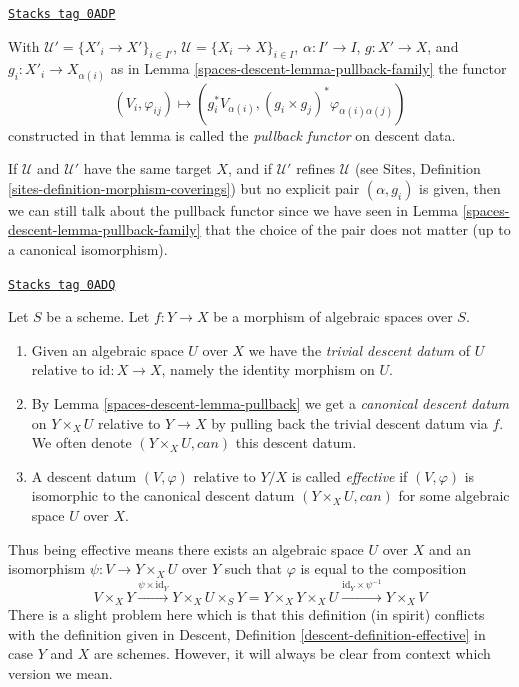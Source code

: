 \begin{definition}
\label{spaces-descent-definition-pullback-functor-family}
\href{https://stacks.math.columbia.edu/tag/0ADP}{\texttt{Stacks tag 0ADP}}

With $\mathcal{U}' = \{X'_i \to X'\}_{i \in I'}$,
$\mathcal{U} = \{X_i \to X\}_{i \in I}$, $\alpha : I' \to I$,
$g : X' \to X$, and $g_i : X'_i \to X_{\alpha(i)}$ as in
Lemma \ref{spaces-descent-lemma-pullback-family} the functor
$$
(V_i, \varphi_{ij}) \longmapsto
(g_i^*V_{\alpha(i)}, (g_i \times g_j)^*\varphi_{\alpha(i) \alpha(j)})
$$
constructed in that lemma
is called the {\it pullback functor} on descent data.
\end{definition}

If $\mathcal{U}$ and $\mathcal{U}'$ have the same target $X$,
and if $\mathcal{U}'$ refines $\mathcal{U}$ (see
Sites, Definition \ref{sites-definition-morphism-coverings})
but no explicit pair $(\alpha, g_i)$ is given, then we can still
talk about the pullback functor since we have seen in
Lemma \ref{spaces-descent-lemma-pullback-family} that the choice of the pair does not matter
(up to a canonical isomorphism).

\begin{definition}[Effective]
\label{spaces-descent-definition-effective}
\href{https://stacks.math.columbia.edu/tag/0ADQ}{\texttt{Stacks tag 0ADQ}}

Let $S$ be a scheme. Let $f : Y \to X$ be a morphism of algebraic spaces over
$S$.
\begin{enumerate}
\item Given an algebraic space $U$ over $X$ we have the
{\it trivial descent datum} of $U$ relative to $\text{id} : X \to X$, namely
the identity morphism on $U$.
\item By Lemma \ref{spaces-descent-lemma-pullback} we get a
{\it canonical descent datum} on $Y \times_X U$
relative to $Y \to X$ by pulling back the trivial
descent datum via $f$. We often
denote $(Y \times_X U, can)$ this descent datum.
\item A descent datum $(V, \varphi)$ relative to $Y/X$
is called {\it effective} if $(V, \varphi)$
is isomorphic to the canonical descent datum
$(Y \times_X U, can)$ for some algebraic space $U$ over $X$.
\end{enumerate}
\end{definition}

Thus being effective means there exists an algebraic space $U$
over $X$ and an isomorphism $\psi : V \to Y \times_X U$
over $Y$ such that $\varphi$ is equal to the composition
$$
V \times_X Y \xrightarrow{\psi \times \text{id}_Y}
Y \times_X U \times_S Y =
Y \times_X Y \times_X U
\xrightarrow{\text{id}_Y \times \psi^{-1}}
Y \times_X V
$$
There is a slight problem here which is that this definition
(in spirit) conflicts with the definition given in
Descent, Definition \ref{descent-definition-effective}
in case $Y$ and $X$ are schemes. However, it will always be clear from
context which version we mean.

